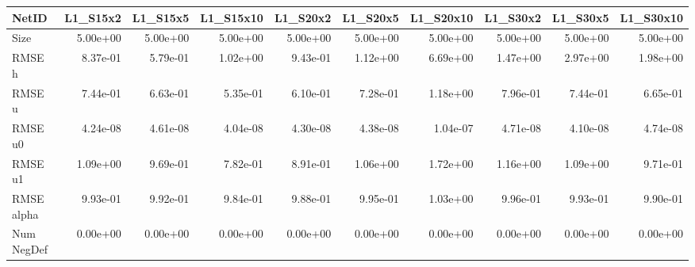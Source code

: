 \documentclass{article}
\theoremstyle{remark}
\numberwithin{equation}{subsection}
\begin{document}
\begin{tabular}{lrrrrrrrrr}
\toprule
NetID &  L1\_S15x2 &  L1\_S15x5 &  L1\_S15x10 &  L1\_S20x2 &  L1\_S20x5 &  L1\_S20x10 &  L1\_S30x2 &  L1\_S30x5 &  L1\_S30x10 \\
\midrule
Size       &  5.00e+00 &  5.00e+00 &   5.00e+00 &  5.00e+00 &  5.00e+00 &   5.00e+00 &  5.00e+00 &  5.00e+00 &   5.00e+00 \\
RMSE h     &  8.37e-01 &  5.79e-01 &   1.02e+00 &  9.43e-01 &  1.12e+00 &   6.69e+00 &  1.47e+00 &  2.97e+00 &   1.98e+00 \\
RMSE u     &  7.44e-01 &  6.63e-01 &   5.35e-01 &  6.10e-01 &  7.28e-01 &   1.18e+00 &  7.96e-01 &  7.44e-01 &   6.65e-01 \\
RMSE u0    &  4.24e-08 &  4.61e-08 &   4.04e-08 &  4.30e-08 &  4.38e-08 &   1.04e-07 &  4.71e-08 &  4.10e-08 &   4.74e-08 \\
RMSE u1    &  1.09e+00 &  9.69e-01 &   7.82e-01 &  8.91e-01 &  1.06e+00 &   1.72e+00 &  1.16e+00 &  1.09e+00 &   9.71e-01 \\
RMSE alpha &  9.93e-01 &  9.92e-01 &   9.84e-01 &  9.88e-01 &  9.95e-01 &   1.03e+00 &  9.96e-01 &  9.93e-01 &   9.90e-01 \\
Num NegDef &  0.00e+00 &  0.00e+00 &   0.00e+00 &  0.00e+00 &  0.00e+00 &   0.00e+00 &  0.00e+00 &  0.00e+00 &   0.00e+00 \\
\bottomrule
\end{tabular}
\end{document}
